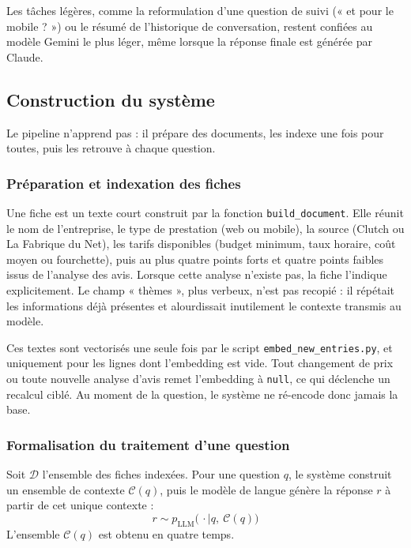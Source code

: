 Les tâches légères, comme la reformulation d'une question de suivi (« et pour le mobile ? ») ou le résumé de
l'historique de conversation, restent confiées au modèle Gemini le plus léger, même lorsque la réponse
finale est générée par Claude.

\subsection{Construction du système}

Le pipeline n'apprend pas : il prépare des documents, les indexe une fois pour toutes, puis les retrouve à
chaque question.

\subsubsection{Préparation et indexation des fiches}

Une fiche est un texte court construit par la fonction \texttt{build\_document}. Elle réunit le nom de
l'entreprise, le type de prestation (web ou mobile), la source (Clutch ou La Fabrique du Net), les tarifs
disponibles (budget minimum, taux horaire, coût moyen ou fourchette), puis au plus quatre points forts et
quatre points faibles issus de l'analyse des avis. Lorsque cette analyse n'existe pas, la fiche l'indique
explicitement. Le champ « thèmes », plus verbeux, n'est pas recopié : il répétait les informations déjà
présentes et alourdissait inutilement le contexte transmis au modèle.

Ces textes sont vectorisés une seule fois par le script \texttt{embed\_new\_entries.py}, et uniquement pour
les lignes dont l'embedding est vide. Tout changement de prix ou toute nouvelle analyse d'avis remet
l'embedding à \texttt{null}, ce qui déclenche un recalcul ciblé. Au moment de la question, le système ne
ré-encode donc jamais la base.

\subsubsection{Formalisation du traitement d'une question}

Soit $\mathcal{D}$ l'ensemble des fiches indexées. Pour une question $q$, le système construit un ensemble de
contexte $\mathcal{C}(q)$, puis le modèle de langue génère la réponse $r$ à partir de cet unique contexte :
\begin{equation}
    r \sim p_{\text{LLM}}\big(\,\cdot \mid q,\ \mathcal{C}(q)\big)
    \label{eq:rag}
\end{equation}
L'ensemble $\mathcal{C}(q)$ est obtenu en quatre temps.

